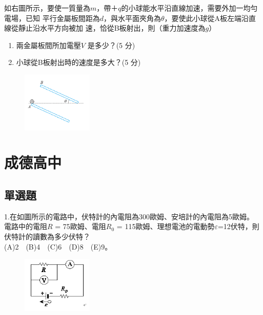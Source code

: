 \documentclass[cn,10pt,math=newtx]{elegantbook}
\begin{document}
\begin{example}
   如右圖所示，要使一質量為$m$，帶$＋q$的小球能水平沿直線加速，需要外加一均勻電場，已知
平行金屬板間距為$d$，與水平面夾角為$\theta$，要使此小球從A板左端沿直線從靜止沿水平方向被加
速，恰從B板射出，則（重力加速度為$g$）
\begin{enumerate}[label=(\arabic*)] 
  \item 兩金屬板間所加電壓$V$ 是多少？(5 分)
  \item 小球從B板射出時的速度是多大？(5 分)
    \end{enumerate}

    \rightline{[台中女中教甄109]}
\end{example}
\begin{solution}
    
\end{solution}
\begin{figure}[htbp]
    \flushright
    \includegraphics[width=0.3\textwidth]{image/109中女24.png}
  \end{figure}
\newpage






\chapter{成德高中}


\section{單選題}


\begin{example}
  1.在如圖所示的電路中，伏特計的內電阻為300歐姆、安培計的內電阻為5歐姆。
  電路中的電阻$R$ = 75歐姆、電阻$R_0$ = 115歐姆、理想電池的電動勢$\varepsilon $=12伏特，則伏特計的讀數為多少伏特？\\
  (A)2　(B)4　(C)6　(D)8　(E)9。\\
  \rightline{[成德高中教甄109]}
\end{example}
\begin{solution}
  
\end{solution}
\begin{figure}[htbp]
    \flushright
    \includegraphics[width=0.3\textwidth]{image/109成德1.png}
  \end{figure}
\newpage
\end{document}
